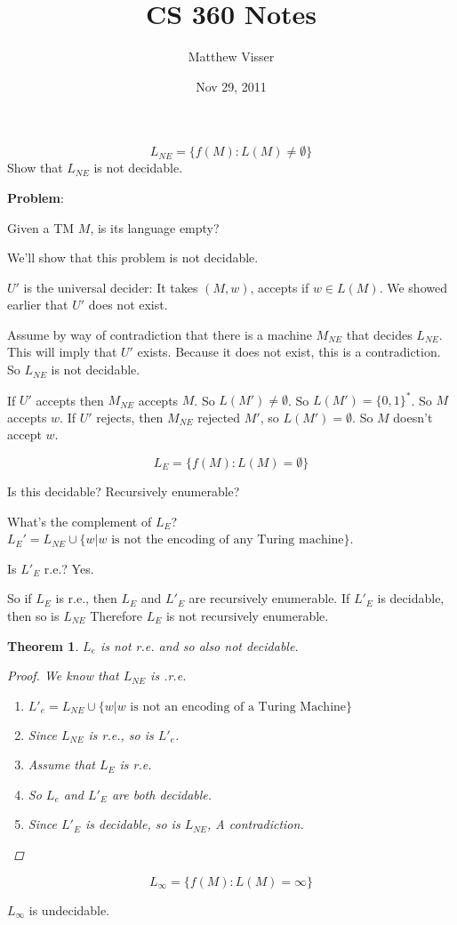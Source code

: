 \documentclass[12pt]{article}
\begin{document}
\newtheorem{thm}{Theorem}

\title{CS 360 Notes}
\author{Matthew Visser}
\date{Nov 29, 2011}
\maketitle

\begin{equation}
	L_{NE} = \{ f(M): L(M) \neq \emptyset \}
\end{equation}
Show that $L_{NE}$ is not decidable.

\textbf{Problem}:

Given a TM $M$, is its language empty?

We'll show that this problem is not decidable.

$U'$ is the universal decider: It takes $(M,w)$, accepts if $w \in L(M)$. We
showed earlier that $U'$ does not exist.

Assume by way of contradiction that there is a machine $M_{NE}$ that decides
$L_{NE}$. This will imply that $U'$ exists. Because it does not exist, this is a
contradiction. So $L_{NE}$ is not decidable.

If $U'$ accepts then $M_{NE}$ accepts $M$. So $L(M') \neq \emptyset$. So $L(M')
= \{0,1\}^*$. So $M$ accepts $w$. If $U'$ rejects, then $M_{NE}$ rejected $M'$,
so $L(M') = \emptyset$. So $M$ doesn't accept $w$.

\begin{equation}
	L_E = \{ f(M): L(M) = \emptyset \}
\end{equation}

Is this decidable? Recursively enumerable?

What's the complement of $L_E$? $L_{E}' = L_{NE} \cup \{w | w \text{ is not the
encoding of any Turing machine}\}$.

Is $L'_{E}$ r.e.? Yes.

So if $L_{E}$ is r.e., then $L_{E}$ and $L'_E$ are recursively enumerable. If
$L'_E$ is decidable, then so is  $L_{NE}$ Therefore $L_E$ is not recursively
enumerable.

\begin{thm}
	$L_e$ is not r.e. and so also not decidable.
	\begin{proof}
		We know that $L_{NE}$ is .r.e.
		\begin{enumerate}
			\item $L'_e = L_{NE} \cup \{ w | \text{$w$ is not an encoding of a
				Turing Machine}\}$
			\item Since $L_{NE}$ is r.e., so is $L'_e$.
			\item Assume that $L_E$ is r.e.
			\item So $L_e$ and $L'_E$ are both decidable.
			\item Since $L'_E$ is decidable, so is $L_{NE}$, A contradiction.
		\end{enumerate}
	\end{proof}
\end{thm}

\begin{equation}
L_\infty = \{f(M): L(M) = \infty \}
\end{equation}

$L_\infty$ is undecidable.
\end{document}
